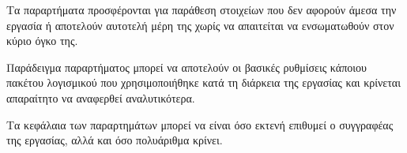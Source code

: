 Τα παραρτήματα προσφέρονται για παράθεση στοιχείων που δεν αφορούν
άμεσα την εργασία ή αποτελούν αυτοτελή μέρη της χωρίς να απαιτείται
να ενσωματωθούν στον κύριο όγκο της.

Παράδειγμα παραρτήματος μπορεί να αποτελούν οι βασικές ρυθμίσεις
κάποιου πακέτου λογισμικού που χρησιμοποιήθηκε κατά τη διάρκεια
της εργασίας και κρίνεται απαραίτητο να αναφερθεί αναλυτικότερα.

Τα κεφάλαια των παραρτημάτων μπορεί να είναι όσο εκτενή επιθυμεί
ο συγγραφέας της εργασίας, αλλά και όσο πολυάριθμα κρίνει.